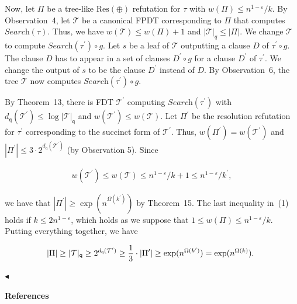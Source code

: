 \documentclass[10pt,a4paper]{article}
\begin{document}
Now, let $\Pi$ be a tree-like $\text{Res}(\oplus)$ refutation for $\tau$ with $w(\Pi)\leq n^{1-\varepsilon}/k$.
By Observation 4, let $\mathcal{T}$ be a canonical FPDT corresponding to $\Pi$ that computes $\textit{Search}(\tau)$.
Thus, we have $w(\mathcal{T})\leq w(\Pi)+1$ and $|\mathcal{T}|_{q}\leq|\Pi|$.
We change $\mathcal{T}$ to compute $\textit{Search}(\tau^{\prime})\circ g$.
Let $s$ be a leaf of $\mathcal{T}$ outputting a clause $D$ of $\tau^{\prime}\circ g$.
The clause $D$ has to appear in a set of clauses $D^{\prime}\circ g$ for a clause $D^{\prime}$ of $\tau^{\prime}$.
We change the output of $s$ to be the clause $D^{\prime}$ instead of $D$.
By Observation 6, the tree $\mathcal{T}$ now computes $\textit{Search}(\tau^{\prime})\circ g$.\par




By Theorem 13, there is FDT $\mathcal{T}^{\prime}$ computing $\textit{Search}(\tau^{\prime})$ with $d_{\mathsf{q}}(\mathcal{T}^{\prime})\leq\log|\mathcal{T}|_{\mathsf{q}}$ and $w(\mathcal{T}^{\prime})\leq w(\mathcal{T})$.
Let $\Pi^{\prime}$ be the resolution refutation for $\tau^{\prime}$ corresponding to the succinct form of $\mathcal{T}^{\prime}$.
Thus, $w(\Pi^{\prime})=w(\mathcal{T}^{\prime})$ and $|\Pi^{\prime}|\leq 3\cdot 2^{d_{\mathsf{q}}(\mathcal{T}^{\prime})}$ (by Observation 5).
Since\par


\[\begin{gathered}
w(\mathcal{T}^{\prime})\leq w(\mathcal{T})\leq n^{1-\varepsilon}/k+1\leq n^{1-%
\varepsilon}/k^{\prime},
\end{gathered}\]


we have that $|\Pi^{\prime}|\geq\exp(n^{\Omega(k^{\prime})})$ by Theorem 15.
The last inequality in (1) holds if $k\leq 2n^{1-\varepsilon}$, which holds as we suppose that $1\leq w(\Pi)\leq n^{1-\varepsilon}/k$.
Putting everything together, we have\par


\[\begin{gathered}
|\Pi|\geq|\mathcal{T}|_{\mathsf{q}}\geq 2^{d_{\mathsf{q}}(\mathcal{T}^{\prime}%
)}\geq\frac{1}{3}\cdot|\Pi^{\prime}|\geq\exp(n^{\Omega(k^{\prime})})=\exp(n^{%
\Omega(k)}).\
\end{gathered}\]


$\blacktriangleleft$\par






\par\medskip\noindent\textbf{References}\par
\end{document}
